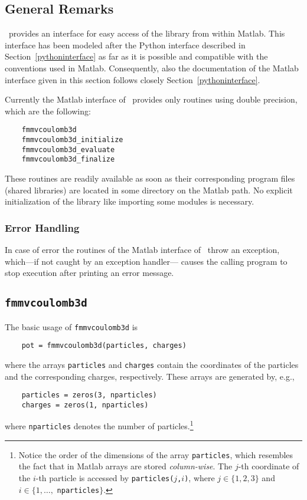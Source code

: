 \subsection{General Remarks}
\fmmv\ provides an interface for easy access of the library from within {\sc Matlab}.
This interface has been modeled after the Python interface described 
in Section~\ref{pythoninterface} as far as it is
possible and compatible with the
conventions used in {\sc Matlab}.
Consequently, also the documentation of the {\sc Matlab} interface given in this
section follows closely Section~\ref{pythoninterface}.

Currently the {\sc Matlab} interface of \fmmv\ provides only routines using
double precision, which are the following:
\begin{verbatim}
    fmmvcoulomb3d
    fmmvcoulomb3d_initialize
    fmmvcoulomb3d_evaluate
    fmmvcoulomb3d_finalize
\end{verbatim}
These routines are readily available as soon as their corresponding program
files (shared libraries) are located in some directory on the {\sc Matlab} path.
No explicit initialization of the library 
like importing some modules is necessary.
\subsubsection*{Error Handling}
In case of error the routines of the {\sc Matlab} interface of \fmmv\
throw an exception, 
which---if not caught by an exception handler---
causes the calling program to stop execution after printing an error message.


\subsection{\tt fmmvcoulomb3d}
The basic usage of \verb|fmmvcoulomb3d| is
\begin{verbatim}
    pot = fmmvcoulomb3d(particles, charges)
\end{verbatim}
where the arrays \verb|particles| and \verb|charges| 
contain the coordinates of
the particles and the corresponding charges, respectively.
These arrays are generated by, e.g.,
\begin{verbatim}
    particles = zeros(3, nparticles)
    charges = zeros(1, nparticles)
\end{verbatim}
where \verb|nparticles| denotes the number of particles.\footnote{Notice
the order of
the dimensions of the array {\tt particles}, which resembles the
fact that in {\sc Matlab} arrays are stored {\em column-wise}.
The $j$-th coordinate of the $i$-th particle is accessed by
{\tt particles(}$j${\tt ,}$i${\tt )},
where $j\in\{1,2,3\}$ and $i\in\{1,\dots, $ {\tt nparticles}$\}$.
}

